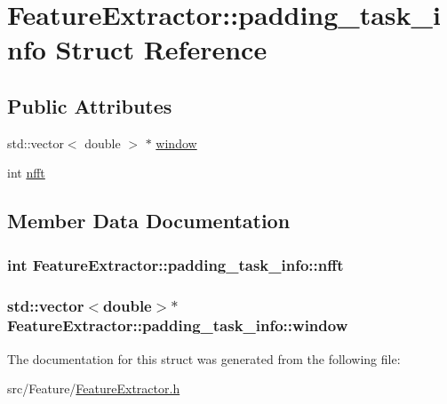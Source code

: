 \hypertarget{struct_feature_extractor_1_1padding__task__info}{\section{Feature\+Extractor\+:\+:padding\+\_\+task\+\_\+info Struct Reference}
\label{struct_feature_extractor_1_1padding__task__info}
}
\subsection*{Public Attributes}
\begin{DoxyCompactItemize}
\item 
std\+::vector$<$ double $>$ $\ast$ \hyperlink{struct_feature_extractor_1_1padding__task__info_a9a88478c04cf54c33f9b75830612894f}{window}
\item 
int \hyperlink{struct_feature_extractor_1_1padding__task__info_a6938d448f871a7011e161ae5514735da}{nfft}
\end{DoxyCompactItemize}


\subsection{Member Data Documentation}
\hypertarget{struct_feature_extractor_1_1padding__task__info_a6938d448f871a7011e161ae5514735da}{
\subsubsection[{nfft}]{\setlength{\rightskip}{0pt plus 5cm}int Feature\+Extractor\+::padding\+\_\+task\+\_\+info\+::nfft}}\label{struct_feature_extractor_1_1padding__task__info_a6938d448f871a7011e161ae5514735da}
\hypertarget{struct_feature_extractor_1_1padding__task__info_a9a88478c04cf54c33f9b75830612894f}{
\subsubsection[{window}]{\setlength{\rightskip}{0pt plus 5cm}std\+::vector$<$double$>$$\ast$ Feature\+Extractor\+::padding\+\_\+task\+\_\+info\+::window}}\label{struct_feature_extractor_1_1padding__task__info_a9a88478c04cf54c33f9b75830612894f}


The documentation for this struct was generated from the following file\+:\begin{DoxyCompactItemize}
\item 
src/\+Feature/\hyperlink{_feature_extractor_8h}{Feature\+Extractor.\+h}\end{DoxyCompactItemize}
